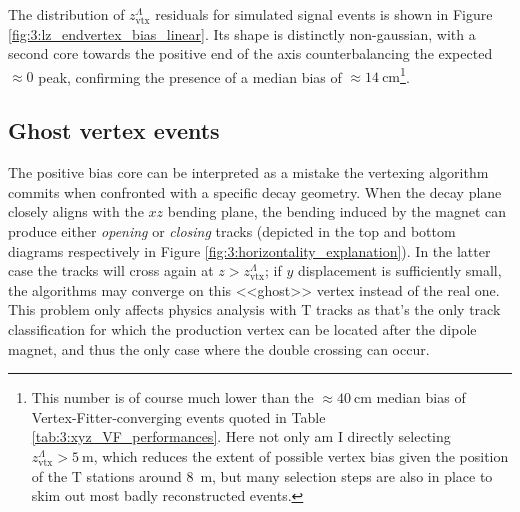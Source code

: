 The distribution of $z_\text{vtx}^\Lambda$ residuals for simulated signal events is shown in Figure \ref{fig:3:lz_endvertex_bias_linear}.
Its shape is distinctly non-gaussian, with a second core towards the positive end of the axis counterbalancing the expected $\approx 0$ peak, confirming the presence of a median bias of $\approx \SI{14}{\centi\meter}$\footnote{This number is of course much lower than the $\approx \SI{40}{\centi\meter}$ median bias of Vertex-Fitter-converging events quoted in Table \ref{tab:3:xyz_VF_performances}. Here not only am I directly selecting $z_\text{vtx}^\Lambda > \SI{5}{\meter}$, which reduces the extent of possible vertex bias given the position of the T stations around \SI{8}{\meter}, but many selection steps are also in place to skim out most badly reconstructed events.}.

\subsection{Ghost vertex events}
\label{sec:3:ghost_vertex}

The positive bias core can be interpreted as a mistake the vertexing algorithm commits when confronted with a specific decay geometry.
When the \lambdadecay decay plane closely aligns with the $xz$ bending plane, the bending induced by the magnet can produce either \textit{opening} or \textit{closing} tracks (depicted in the top and bottom diagrams respectively in Figure \ref{fig:3:horizontality_explanation}).
In the latter case the tracks will cross again at $z>z_\text{vtx}^\Lambda$;
if $y$ displacement is sufficiently small, the algorithms may converge on this <<ghost>> vertex instead of the real one.
This problem only affects physics analysis with T tracks as that's the only track classification for which the production vertex can be located after the dipole magnet, and thus the only case where the double crossing can occur.


